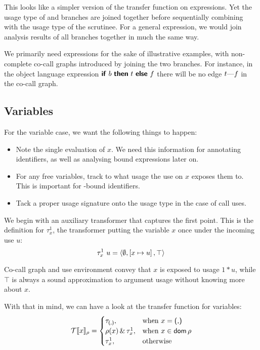 This looks like a simpler version of the transfer function on  expressions.
Yet the usage type of  and  branches are joined together before sequentially combining with the usage type of the scrutinee.
For a general  expression, we would join analysis results of all branches together in much the same way.

We primarily need  expressions for the sake of illustrative examples, with non-complete co-call graphs introduced by joining the two branches. 
For instance, in the object language expression $\text{\textsf{\textbf{if}}}~b~\text{\textsf{\textbf{then}}}~{t}~\text{\textsf{\textbf{else}}}~{f}$ there will be no edge $t\text{---}f$ in the co-call graph.

\subsection{Variables}\label{sec:var}

For the variable case, we want the following things to happen:

\begin{itemize}
\item Note the single evaluation of $x$. We need this information for annotating identifiers, as well as analysing bound expressions later on.
\item For any free variables, track to what usage the use on $x$ exposes them to. This is important for -bound identifiers.
\item Tack a proper usage signature onto the usage type in the case of call uses.
\end{itemize}

We begin with an auxiliary transformer that captures the first point. 
This is the definition for $\tau^1_x$, the transformer putting the variable $x$ once under the incoming use $u$:
\[
\tau^1_x~u = \left\langle{}\emptyset,\left[x\mapsto u\right],\top\right\rangle{}
\]

Co-call graph and use environment convey that $x$ is exposed to usage $1*u$, while $\top$ is always a sound approximation to argument usage without knowing more about $x$.

With that in mind, we can have a look at the transfer function for variables:
\[
\mathcal{T}\llbracket x\rrbracket_{\rho} =
  \begin{cases}
    \tau_{\text{\textsf{(,)}}}, & \text{when } x = \text{\textsf{(,)}} \\
    \rho(x) \,\&\, \tau^1_x, & \text{when } x\in \mathsf{dom}\,\rho \\
    \tau^1_x, & \text{otherwise}
  \end{cases}
\]

